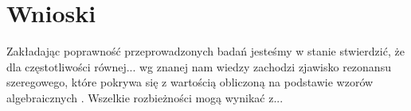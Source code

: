 \documentclass[polish,a4paper]{article}
\begin{document}
\section{Wnioski}
Zakładając poprawność przeprowadzonych badań jesteśmy w stanie stwierdzić, że dla częstotliwości równej... wg znanej nam wiedzy \cite{bolkowski1986teoria} zachodzi zjawisko rezonansu szeregowego, które pokrywa się z wartością obliczoną na podstawie wzorów algebraicznych \cite{bolkowski1986teoria}. Wszelkie rozbieżności mogą wynikać z...



\end{document}
